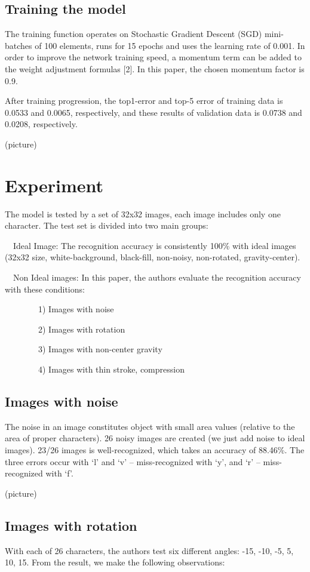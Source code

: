 \documentclass[10pt,twocolumn,letterpaper]{article}
\begin{document}
\subsection{Training the model}
The training function operates on Stochastic Gradient Descent (SGD) mini-batches of 100 elements, runs for 15 epochs and uses the learning rate of 0.001. In order to improve the network training speed, a momentum term can be added to the weight adjustment formulas [2]. In this paper, the chosen momentum factor is 0.9.

After training progression, the top1-error and top-5 error of training data is 0.0533 and 0.0065, respectively, and these results of validation data is 0.0738 and 0.0208, respectively.

(picture)

\section{Experiment}
The model is tested by a set of 32x32 images, each image includes only one character. The test set is divided into two main groups:

~~Ideal Image: The recognition accuracy is consistently 100\% with ideal images (32x32 size, white-background, black-fill, non-noisy, non-rotated, gravity-center).

~~Non Ideal images: In this paper, the authors evaluate the recognition accuracy with these conditions:

~~~~~~~~1) Images with noise

~~~~~~~~2) Images with rotation

~~~~~~~~3) Images with non-center gravity

~~~~~~~~4) Images with thin stroke, compression

\subsection{Images with noise}

The noise in an image constitutes object with small area values (relative to the area of proper characters). 26 noisy images are created (we just add noise to ideal images). 23/26 images is well-recognized, which takes an accuracy of 88.46\%. The three errors occur with ‘l’ and ‘v’ – miss-recognized with ‘y’, and ‘r’ – miss-recognized with ‘f’.

(picture)

\subsection{Images with rotation}
With each of 26 characters, the authors test six different angles: -15, -10, -5, 5, 10, 15. From the result, we make the following observations:
\end{document}
